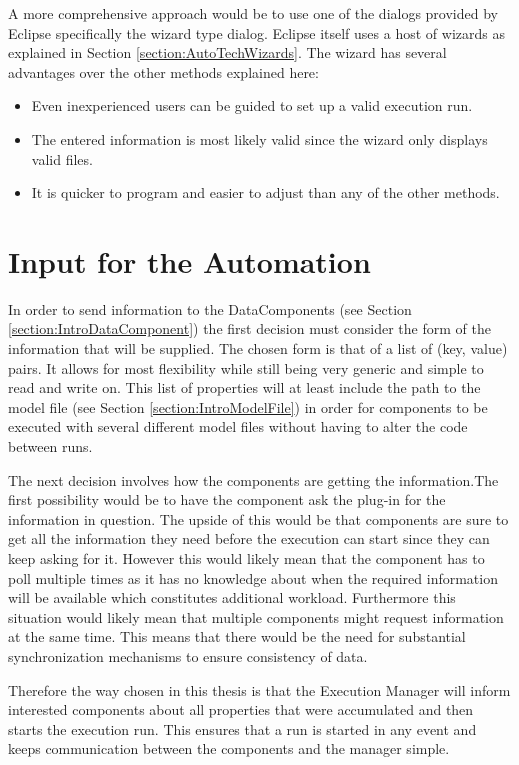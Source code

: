 A more comprehensive approach would be to use one of the dialogs provided by Eclipse specifically the wizard type dialog.
Eclipse itself uses a host of wizards as explained in Section \ref{section:AutoTechWizards}.
The wizard has several advantages over the other methods explained here:
\begin{itemize}
 \item Even inexperienced users can be guided to set up a valid execution run.
 \item The entered information is most likely valid since the wizard only displays valid files.
 \item It is quicker to program and easier to adjust than any of the other methods.
\end{itemize}


\section{Input for the Automation}
\label{section:AutoConceptsInput}
In order to send information to the DataComponents (see Section \ref{section:IntroDataComponent})
the first decision must consider the form of the information that will be supplied.
The chosen form is that of a list of (key, value) pairs. It allows for most
flexibility while still being very generic and simple to read and write on.
This list of properties will at least include the path to the model file (see Section \ref{section:IntroModelFile}) in order
for components to be executed with several different model files without having
to alter the code between runs.

The next decision involves how the components are getting the information.The first possibility 
would be to have the component ask the plug-in for the information
in question. The upside of this would be that components are sure to get all the information
they need before the execution can start since they can keep asking for it. However this would
likely mean that the component has to poll multiple times as it has no knowledge about when
the required information will be available which constitutes additional workload. Furthermore
this situation would likely mean that multiple components might request information
at the same time. This means that there would be the need for substantial synchronization mechanisms
to ensure consistency of data.

Therefore the way chosen in this thesis is that the Execution Manager will inform interested components
about all properties that were accumulated and then starts the execution run. This ensures
that a run is started in any event and keeps communication between the components and the manager simple.

